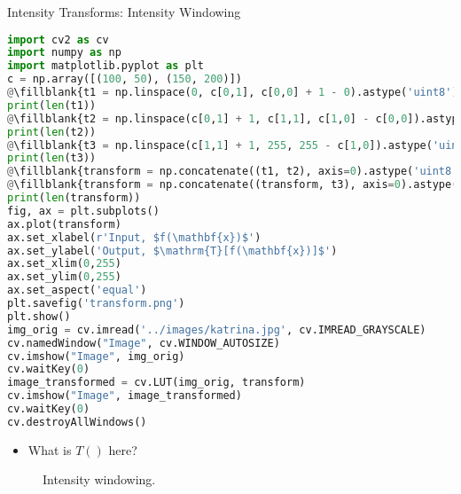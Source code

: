 \begin{frame}{Intensity Transforms: Intensity Windowing }
    \begin{lstlisting}[caption=Intensity Windowing, language=Python, escapechar=\@]
%matplotlib inline
import cv2 as cv
import numpy as np
import matplotlib.pyplot as plt
c = np.array([(100, 50), (150, 200)])
@\fillblank{t1 = np.linspace(0, c[0,1], c[0,0] + 1 - 0).astype('uint8')}@
print(len(t1))
@\fillblank{t2 = np.linspace(c[0,1] + 1, c[1,1], c[1,0] - c[0,0]).astype('uint8')}@
print(len(t2))
@\fillblank{t3 = np.linspace(c[1,1] + 1, 255, 255 - c[1,0]).astype('uint8')}@
print(len(t3))
@\fillblank{transform = np.concatenate((t1, t2), axis=0).astype('uint8')}@
@\fillblank{transform = np.concatenate((transform, t3), axis=0).astype('uint8')}@
print(len(transform))
fig, ax = plt.subplots()
ax.plot(transform)
ax.set_xlabel(r'Input, $f(\mathbf{x})$')
ax.set_ylabel('Output, $\mathrm{T}[f(\mathbf{x})]$')
ax.set_xlim(0,255)
ax.set_ylim(0,255)
ax.set_aspect('equal')
plt.savefig('transform.png')
plt.show()
img_orig = cv.imread('../images/katrina.jpg', cv.IMREAD_GRAYSCALE)
cv.namedWindow("Image", cv.WINDOW_AUTOSIZE)
cv.imshow("Image", img_orig)
cv.waitKey(0)
image_transformed = cv.LUT(img_orig, transform)
cv.imshow("Image", image_transformed)
cv.waitKey(0)
cv.destroyAllWindows()
    \end{lstlisting}

\begin{itemize}
    \item What is $T()$ here?
\end{itemize}
        \begin{figure}
          \centering
            
          \caption{Intensity windowing.}
        \end{figure}
\end{frame}




